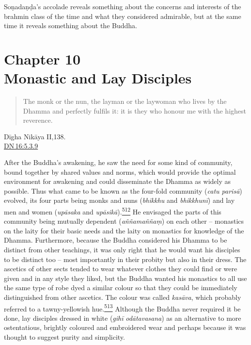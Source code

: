 Soṇadaṇḍa's accolade reveals something about the concerns and interests
of the brahmin class of the time and what they considered admirable, but
at the same time it reveals something about the Buddha.

\label{footprints_split_013.html_calibre_pb_27}

\label{footprints_split_014.html}{}

\section{\texorpdfstring{{Chapter 10}\\
Monastic and Lay
Disciples}{Chapter 10 Monastic and Lay Disciples}}\label{footprints_split_014.html_TOCTarget10}

\begin{quote}
The monk or the nun, the layman or the laywoman who lives by the Dhamma
and perfectly fulfils it: it is they who honour me with the highest
reverence.
\end{quote}

Dīgha Nikāya II,138.\\
\href{https://suttacentral.net/dn16/en/sujato\#5.3.9}{DN\,16:5.3.9}

After the Buddha's awakening, he saw the need for some kind of
community, bound together by shared values and norms, which would
provide the optimal environment for awakening and could disseminate the
Dhamma as widely as possible. Thus what came to be known as the
four-fold community (\emph{catu parisā}) evolved, its four parts being
monks and nuns (\emph{bhikkhu} and \emph{bhikkhunī}) and lay men and
women (\emph{upāsaka} and
\emph{upāsikā}).\label{footprints_split_014.html_fnref512}\hyperref[footprints_split_025.htmlux5cux23fn512]{\textsuperscript{512}}
He envisaged the parts of this community being mutually dependent
(\emph{aññamaññaṃ}) on each other -- monastics on the laity for their
basic needs and the laity on monastics for knowledge of the Dhamma.
Furthermore, because the Buddha considered his Dhamma to be distinct
from other teachings, it was only right that he would want his disciples
to be distinct too -- most importantly in their probity but also in
their dress. The ascetics of other sects tended to wear whatever clothes
they could find or were given and in any style they liked, but the
Buddha wanted his monastics to all use the same type of robe dyed a
similar colour so that they could be immediately distinguished from
other ascetics. The colour was called \emph{kasāva}, which probably
referred to a tawny-yellowish
hue.\label{footprints_split_014.html_fnref513}\hyperref[footprints_split_025.htmlux5cux23fn513]{\textsuperscript{513}}
Although the Buddha never required it be done, lay disciples dressed in
white (\emph{gihī} \emph{odātavasana}) as an alternative to more
ostentatious, brightly coloured and embroidered wear and perhaps because
it was thought to suggest purity and simplicity.

